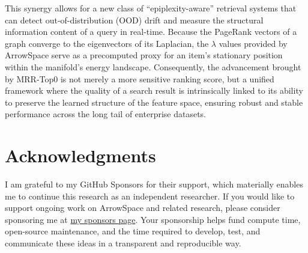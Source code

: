 \documentclass[11pt,a4paper]{article}
\begin{document}
This synergy allows for a new class of ``epiplexity-aware'' retrieval systems that can detect out-of-distribution (OOD) drift and measure the structural information content of a query in real-time. Because the PageRank vectors of a graph converge to the eigenvectors of its Laplacian, the $\lambda$ values provided by ArrowSpace serve as a precomputed proxy for an item's stationary position within the manifold's energy landscape. Consequently, the advancement brought by MRR-Top0 is not merely a more sensitive ranking score, but a unified framework where the quality of a search result is intrinsically linked to its ability to preserve the learned structure of the feature space, ensuring robust and stable performance across the long tail of enterprise datasets.


\newpage
\section*{Acknowledgments}

 I am grateful to my GitHub Sponsors for their support, which materially enables me to continue this research as an independent researcher. If you would like to support ongoing work on ArrowSpace and related research, please consider sponsoring me at \href{https://github.com/sponsors/tuned-org-uk}{my sponsors page}. Your sponsorship helps fund compute time, open-source maintenance, and the time required to
develop, test, and communicate these ideas in a transparent and reproducible way.
\end{document}
